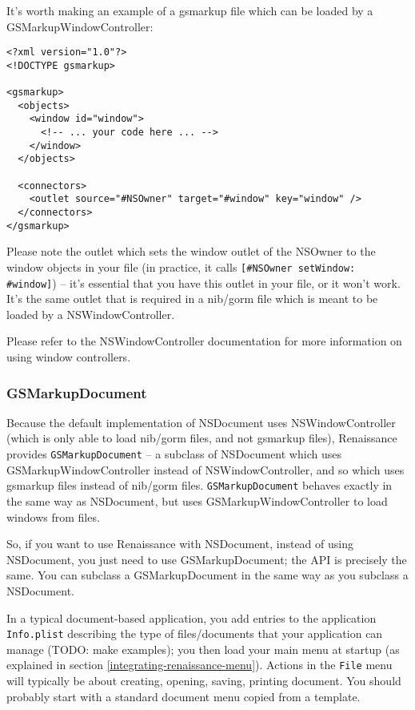 It's worth making an example of a gsmarkup file which can be loaded by 
a GSMarkupWindowController:
\begin{verbatim}
<?xml version="1.0"?>
<!DOCTYPE gsmarkup>

<gsmarkup>
  <objects>
    <window id="window">
      <!-- ... your code here ... -->
    </window>
  </objects>

  <connectors>
    <outlet source="#NSOwner" target="#window" key="window" />
  </connectors>
</gsmarkup>
\end{verbatim}
Please note the outlet which sets the window outlet of the NSOwner to
the window objects in your file (in practice, it calls
\texttt{[\#NSOwner setWindow: \#window]}) -- it's essential that you have
this outlet in your file, or it won't work.  It's the same outlet that
is required in a nib/gorm file which is meant to be loaded by a 
NSWindowController.

Please refer to the NSWindowController documentation for more information
on using window controllers.

\subsubsection{GSMarkupDocument}
Because the default implementation of NSDocument uses
NSWindowController (which is only able to load nib/gorm files, and not
gsmarkup files), Renaissance provides \texttt{GSMarkupDocument} -- a
subclass of NSDocument which uses GSMarkupWindowController instead of
NSWindowController, and so which uses gsmarkup files instead of
nib/gorm files.  \texttt{GSMarkupDocument} behaves exactly in the same
way as NSDocument, but uses GSMarkupWindowController to load windows
from files.

So, if you want to use Renaissance with NSDocument, instead of using
NSDocument, you just need to use GSMarkupDocument; the API is
precisely the same.  You can subclass a GSMarkupDocument in the same
way as you subclass a NSDocument.

In a typical document-based application, you add entries to the
application \texttt{Info.plist} describing the type of files/documents
that your application can manage (TODO: make examples); you then load
your main menu at startup (as explained in section
\ref{integrating-renaissance-menu}).  Actions in the \texttt{File}
menu will typically be about creating, opening, saving, printing
document.  You should probably start with a standard document menu
copied from a template.

